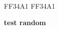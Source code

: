  {FF34A1}
 {FF34A1}
\begindoc
{}
\linebreak
\beginenum
\item \bf{test random}
\item {}
\linebreak
\abb{\coucou}{\cc}
\endenum
\enddoc
